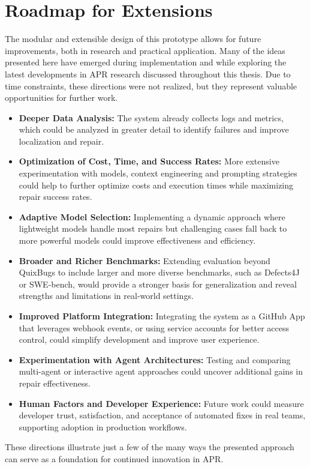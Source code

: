 \section{Roadmap for Extensions} \label{section:roadmap}
The modular and extensible design of this prototype allows for future improvements, both in research and practical application. Many of the ideas presented here have emerged during implementation and while exploring the latest developments in \ac{APR} research discussed throughout this thesis. Due to time constraints, these directions were not realized, but they represent valuable opportunities for further work.

\begin{itemize}
    \item \textbf{Deeper Data Analysis:} The system already collects logs and metrics, which could be analyzed in greater detail to identify failures and improve localization and repair.
    \item \textbf{Optimization of Cost, Time, and Success Rates:} More extensive experimentation with models, context engineering and prompting strategies could help to further optimize costs and execution times while maximizing repair success rates.
    \item \textbf{Adaptive Model Selection:} Implementing a dynamic approach where lightweight models handle most repairs but challenging cases fall back to more powerful models could improve effectiveness and efficiency.
    \item \textbf{Broader and Richer Benchmarks:} Extending evaluation beyond QuixBugs to include larger and more diverse benchmarks, such as Defects4J or SWE-bench, would provide a stronger basis for generalization and reveal strengths and limitations in real-world settings.
    \item \textbf{Improved Platform Integration:} Integrating the system as a GitHub App that leverages webhook events, or using service accounts for better access control, could simplify development and improve user experience.
    \item \textbf{Experimentation with Agent Architectures:} Testing and comparing multi-agent or interactive agent approaches could uncover additional gains in repair effectiveness.
    \item \textbf{Human Factors and Developer Experience:} Future work could measure developer trust, satisfaction, and acceptance of automated fixes in real teams, supporting adoption in production workflows.
\end{itemize}

These directions illustrate just a few of the many ways the presented approach can serve as a foundation for continued innovation in \acf{APR}.

